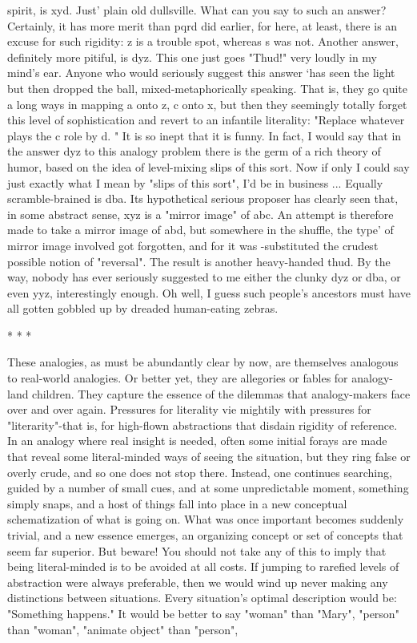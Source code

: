 spirit, is xyd. Just' plain old dullsville. What can you say to such an answer?
Certainly, it has more merit than pqrd did earlier, for here, at least, there is an excuse
for such rigidity: z is a trouble spot, whereas s was not. Another answer, definitely
more pitiful, is dyz. This one just goes "Thud!" very loudly in my mind's ear. Anyone
who would seriously suggest this answer `has seen the light but then dropped the ball,
mixed-metaphorically speaking. That is, they go quite a long ways in mapping a onto
z, c onto x, but then they seemingly totally forget this level of sophistication and
revert to an infantile literality: "Replace whatever plays the c role by d. " It is so inept
that it is funny. In fact, I would say that in the answer dyz to this analogy problem
there is the germ of a rich theory of humor, based on the idea of level-mixing slips of
this sort. Now if only I could say just exactly what I mean by "slips of this sort", I'd be
in business ...
         Equally scramble-brained is dba. Its hypothetical serious proposer has clearly
seen that, in some abstract sense, xyz is a "mirror image" of abc. An attempt is
therefore made to take a mirror image of abd, but somewhere in the shuffle, the type'
of mirror image involved got forgotten, and for it was -substituted the crudest possible
notion of "reversal". The result is another heavy-handed thud. By the way, nobody has
ever seriously suggested to me either the clunky dyz or dba, or even yyz, interestingly
enough. Oh well, I guess such people's ancestors must have all gotten gobbled up by
dreaded human-eating zebras.

                                         *   *   *

         These analogies, as must be abundantly clear by now, are themselves
analogous to real-world analogies. Or better yet, they are allegories or fables for
analogy-land children. They capture the essence of the dilemmas that analogy-makers
face over and over again. Pressures for literality vie mightily with pressures for
"literarity"-that is, for high-flown abstractions that disdain rigidity of reference. In an
analogy where real insight is needed, often some initial forays are made that reveal
some literal-minded ways of seeing the situation, but they ring false or overly crude,
and so one does not stop there. Instead, one continues searching, guided by a number
of small cues, and at some unpredictable moment, something simply snaps, and a host
of things fall into place in a new conceptual schematization of what is going on. What
was once important becomes suddenly trivial, and a new essence emerges, an
organizing concept or set of concepts that seem far superior.
         But beware! You should not take any of this to imply that being literal-minded
is to be avoided at all costs. If jumping to rarefied levels of abstraction were always
preferable, then we would wind up never making any distinctions between situations.
Every situation's optimal description would be: "Something happens." It would be
better to say "woman" than "Mary", "person" than "woman", "animate object" than
"person",




